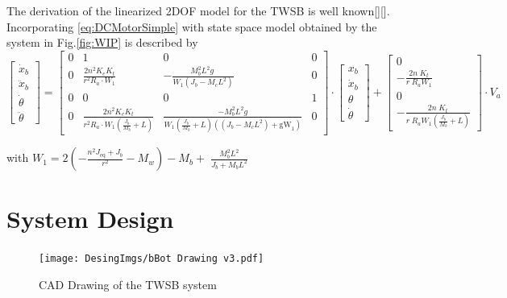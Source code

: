     The derivation of the linearized 2DOF model for the TWSB is well known[][]. Incorporating \ref{eq:DCMotorSimple}
    with state space model obtained by \cite{Velazquez2016VelocityAM} the system in Fig.\ref{fig:WIP} is described by 
    \begin{equation}
        \left\lbrack \begin{array}{c}
        {\dot{x} }_b \\
        {\ddot{x} }_b \\
        \dot{\theta} \\
        \ddot{\theta} 
        \end{array}\right\rbrack =\left\lbrack \begin{array}{cccc}
        0 & 1 & 0 & 0\\
        0 & \frac{2n^2 K_e K_t }{r^2 R_a \cdot W_1 } & -\frac{M_b^2 L^2 g\;}{W_1 \left(J_b -M_c L^2 \right)} & 0\\
        0 & 0 & 0 & 1\\
        0 & \frac{2n^2 K_e K_t }{r^2 R_a \cdot W_1 \left(\frac{J_b }{M_b }+L\right)} & \frac{{-M}_b^2 L^2 g}{W_1 \left(\frac{J_b }{M_b }+L\right)\left(\left(J_b -M_c L^2 \right)+{\mathrm{gW}}_1 \right)} & 0
        \end{array}\right\rbrack \cdot \left\lbrack \begin{array}{c}
        x_b \\
        {\dot{x} }_b \\
        \theta \\
        \dot{\theta} 
        \end{array}\right\rbrack +\left\lbrack \begin{array}{c}
        0\\
        -\frac{2{n\;K}_t }{r\;R_a W_1 }\\
        0\\
        -\frac{2n\;K_t }{r\;R_a W_1 \left(\frac{J_b }{M_b }+L\right)}
        \end{array}\right\rbrack \cdot V_a
        \label{eq:2DOF}
    \end{equation} 

    with $W_1 =2\left(-\frac{n^2 J_{\mathrm{eq}} +J_b }{r^2 }-M_w \right)-M_b +\;\frac{M_b^2 L^2 }{J_b +M_b L^2 }$ 

    \pagebreak{}

    \section{System Design}
        \begin{figure}[H]
            \texttt{[image: DesingImgs/bBot Drawing v3.pdf]}
            \caption{CAD Drawing of the TWSB system}
            \label{fig:CAD}
        \end{figure}

